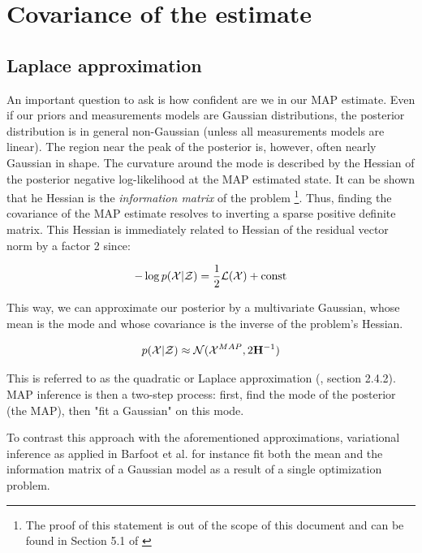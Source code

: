 \section{Covariance of the estimate}
\subsection{Laplace approximation}
\label{sec:map_covariance}
An important question to ask is how confident are we in our MAP estimate. Even if our priors and measurements models are Gaussian distributions, the posterior distribution
is in general non-Gaussian (unless all measurements models are linear). The region near the peak of the posterior is, however, often nearly Gaussian in shape.
The curvature around the mode is described by the Hessian of the posterior negative log-likelihood at the MAP estimated state. 
It can be shown that he Hessian is the \textit{information matrix} of the problem \footnote{The proof of this statement is out of the scope of this document and can be found in Section 5.1 of
\cite{peng2018advanced}}. Thus, finding the covariance of the MAP estimate resolves to inverting a 
sparse positive definite matrix. This Hessian is immediately related to Hessian of the residual vector norm by a factor 2 since:

\begin{equation*}
    -\log p(\mathcal{X}|\mathcal{Z}) = \frac{1}{2}\mathcal{L}(\mathcal{X}) + \text{const}
\end{equation*}

This way, we can approximate our posterior by a multivariate Gaussian, whose mean is the mode and whose covariance 
is the inverse of the problem's Hessian. 

\begin{equation}
    p(\mathcal{X} | \mathcal{Z}) \approx \mathcal{N}({\mathcal{X}^{MAP}},{2{\bf H}^{-1}})
    \label{eq:map_laplace}
\end{equation}

This is referred to as the quadratic or Laplace approximation (\cite{mcelreath2018statistical}, section 2.4.2). MAP inference is then a two-step process: 
first, find the mode of the posterior (the MAP), then "fit a Gaussian" on this mode. 

To contrast this approach with the aforementioned approximations, variational inference as applied in Barfoot et al. 
 \cite{barfoot2020exactly} for instance fit both the mean and the information matrix of a Gaussian model as a result of a single optimization problem.



